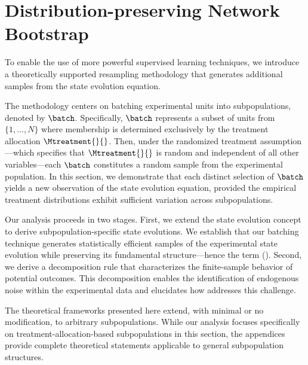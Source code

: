 \section{Distribution-preserving Network Bootstrap}
\label{sec:DPNB}
% 
To enable the use of more powerful supervised learning techniques, we introduce a theoretically supported resampling methodology that generates additional samples from the state evolution equation.

The methodology centers on batching experimental units into subpopulations, denoted by $\batch$. Specifically, $\batch$ represents a subset of units from $\{1, \ldots, N\}$ where membership is determined exclusively by the treatment allocation $\Mtreatment{}{}$. Then, under the randomized treatment assumption—which specifies that $\Mtreatment{}{}$ is random and independent of all other variables—each $\batch$ constitutes a random sample from the experimental population. In this section, we demonstrate that each distinct selection of $\batch$ yields a new observation of the state evolution equation, provided the empirical treatment distributions exhibit sufficient variation across subpopulations.

Our analysis proceeds in two stages. First, we extend the state evolution concept to derive subpopulation-specific state evolutions. We establish that our batching technique generates statistically efficient samples of the experimental state evolution while preserving its fundamental structure—hence the term \batching{} (\batchingAcronym{}). Second, we derive a decomposition rule that characterizes the finite-sample behavior of potential outcomes. This decomposition enables the identification of endogenous noise within the experimental data and elucidates how \batchingAcronym{} addresses this challenge.

\begin{remark}
The theoretical frameworks presented here extend, with minimal or no modification, to arbitrary subpopulations. While our analysis focuses specifically on treatment-allocation-based subpopulations in this section, the appendices provide complete theoretical statements applicable to general subpopulation structures.
\end{remark}


